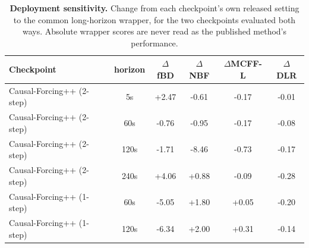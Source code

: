 \begin{table}[tb]
\centering
\small
\setlength{\tabcolsep}{6pt}
\begin{tabular}{l c c c c c}
\toprule
Checkpoint & horizon & $\Delta$fBD & $\Delta$NBF & $\Delta$MCFF-L & $\Delta$DLR \\
\midrule
Causal-Forcing++ (2-step) & 5s & +2.47 & -0.61 & -0.17 & -0.01 \\
Causal-Forcing++ (2-step) & 60s & -0.76 & -0.95 & -0.17 & -0.08 \\
Causal-Forcing++ (2-step) & 120s & -1.71 & -8.46 & -0.73 & -0.17 \\
Causal-Forcing++ (2-step) & 240s & +4.06 & +0.88 & -0.09 & -0.28 \\
Causal-Forcing++ (1-step) & 60s & -5.05 & +1.80 & +0.05 & -0.20 \\
Causal-Forcing++ (1-step) & 120s & -6.34 & +2.00 & +0.31 & -0.14 \\
\bottomrule
\end{tabular}
\caption{\textbf{Deployment sensitivity.} Change from each checkpoint's own released setting to the common long-horizon wrapper, for the two checkpoints evaluated both ways. Absolute wrapper scores are never read as the published method's performance.}
\label{tab:deployment_sensitivity}
\end{table}